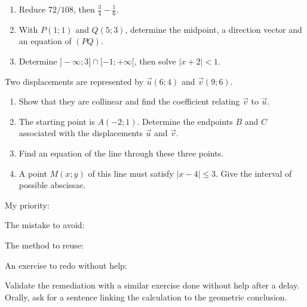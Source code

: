 \begin{example}\begin{enumerate}
\item Reduce $72/108$, then $\frac34-\frac16$.
\item With $P(1;1)$ and $Q(5;3)$, determine the midpoint, a direction vector and an equation of $(PQ)$.
\item Determine $]-\infty;3]\cap[-1;+\infty[$, then solve $|x+2|<1$.
\end{enumerate}\end{example}
\mxanswerspace[5]{1. $2/3$; $7/12$. 2. Midpoint $(3;2)$, direction vector $(2;1)$, equation $x-2y+1=0$. 3. Intersection $[-1;3]$; solution of the inequality $]-3;-1[$.}
\begin{example}Two displacements are represented by $\vec u(6;4)$ and $\vec v(9;6)$.
\begin{enumerate}\item Show that they are collinear and find the coefficient relating $\vec v$ to $\vec u$.
\item The starting point is $A(-2;1)$. Determine the endpoints $B$ and $C$ associated with the displacements $\vec u$ and $\vec v$.
\item Find an equation of the line through these three points.
\item A point $M(x;y)$ of this line must satisfy $|x-4|\leq3$. Give the interval of possible abscissae.
\end{enumerate}\end{example}
\begin{keypoint}[My review]
My priority: \dotfill\par The mistake to avoid: \dotfill\par The method to reuse: \dotfill\par An exercise to redo without help: \dotfill
\end{keypoint}
\begin{teachernote}Validate the remediation with a similar exercise done without help after a delay. Orally, ask for a sentence linking the calculation to the geometric conclusion.\end{teachernote}
